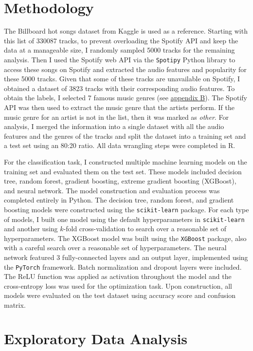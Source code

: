 \documentclass{article}
\begin{document}
\section{Methodology}

The Billboard hot songs dataset from Kaggle is used as a reference. Starting with this list of 330087 tracks, to prevent overloading the Spotify API and keep the data at a manageable size, I randomly sampled 5000 tracks for the remaining analysis. Then I used the Spotify web API via the \texttt{Spotipy} Python library to access these songs on Spotify and extracted the audio features and popularity for these 5000 tracks. Given that some of these tracks are unavailable on Spotify, I obtained a dataset of 3823 tracks with their corresponding audio features. To obtain the labels, I selected 7 famous music genres (see \hyperref[sec:appendixB]{appendix B}). The Spotify API was then used to extract the music genre that the artists perform. If the music genre for an artist is not in the list, then it was marked as \textit{other}. For analysis, I merged the information into a single dataset with all the audio features and the genres of the tracks and split the dataset into a training set and a test set using an 80:20 ratio. All data wrangling steps were completed in R.

For the classification task, I constructed multiple machine learning models on the training set and evaluated them on the test set. These models included decision tree, random forest, gradient boosting, extreme gradient boosting (XGBoost), and neural network. The model construction and evaluation process was completed entirely in Python. The decision tree, random forest, and gradient boosting models were constructed using the \texttt{scikit-learn} package. For each type of models, I built one model using the default hyperparameters in \texttt{scikit-learn} and another using \(k\)-fold cross-validation to search over a reasonable set of hyperparameters. The XGBoost model was built using the \texttt{XGBoost} package, also with a careful search over a reasonable set of hyperparameters. The neural network featured 3 fully-connected layers and an output layer, implemented using the \texttt{PyTorch} framework. Batch normalization and dropout layers were included. The ReLU function was applied as activation throughout the model and the cross-entropy loss was used for the optimization task. Upon construction, all models were evaluated on the test dataset using accuracy score and confusion matrix.

\section{Exploratory Data Analysis}
\end{document}

